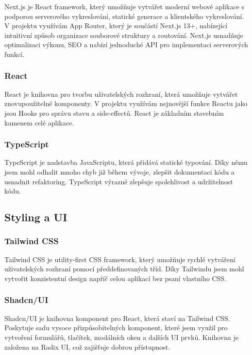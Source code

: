\documentclass[12pt]{article}
\begin{document}
Next.js je React framework, který umožňuje vytvářet moderní webové aplikace s podporou serverového vykreslování, statické generace a klientského vykreslování. V projektu využívám App Router, který je součástí Next.js 13+, nabízející intuitivní způsob organizace souborové struktury a routování. Next.js usnadňuje optimalizaci výkonu, SEO a nabízí jednoduché API pro implementaci serverových funkcí.

\subsubsection{React}

React je knihovna pro tvorbu uživatelských rozhraní, která umožňuje vytvářet znovupoužitelné komponenty. V projektu využívám nejnovější funkce Reactu jako jsou Hooks pro správu stavu a side-effectů. React je základním stavebním kamenem celé aplikace.

\subsubsection{TypeScript}

TypeScript je nadstavba JavaScriptu, která přidává statické typování. Díky němu jsem mohl odhalit mnoho chyb již během vývoje, zlepšit dokumentaci kódu a usnadnit refaktoring. TypeScript výrazně zlepšuje spolehlivost a udržitelnost kódu.

\subsection{Styling a UI}

\subsubsection{Tailwind CSS}

Tailwind CSS je utility-first CSS framework, který umožňuje rychlé vytváření uživatelských rozhraní pomocí předdefinovaných tříd. Díky Tailwindu jsem mohl vytvořit konzistentní design napříč celou aplikací bez psaní vlastního CSS.

\subsubsection{Shadcn/UI}

Shadcn/UI je knihovna komponent pro React, která staví na Tailwind CSS. Poskytuje sadu vysoce přizpůsobitelných komponent, které jsem využil pro vytvoření formulářů, tlačítek, modálních oken a dalších UI prvků. Knihovna je založena na Radix UI, což zajišťuje dobrou přístupnost.
\end{document}
